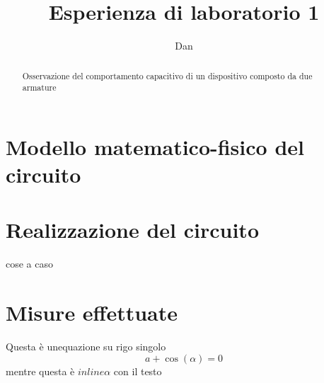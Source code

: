 \documentclass[a4paper,10pt]{article}
\title{Esperienza di laboratorio 1}
\author{Dan}
\begin{document}
\maketitle
\renewcommand{\abstractname}{Premessa}

\begin{abstract}
Osservazione del comportamento capacitivo di un dispositivo composto da due armature
\end{abstract}

\section{Modello matematico-fisico del circuito}

\section{Realizzazione del circuito}
cose a caso

\section{Misure effettuate}
Questa è unequazione su rigo singolo \[a+\cos(\alpha) =0 \]
mentre questa è \(in line\alpha\) con il testo
\end{document}
